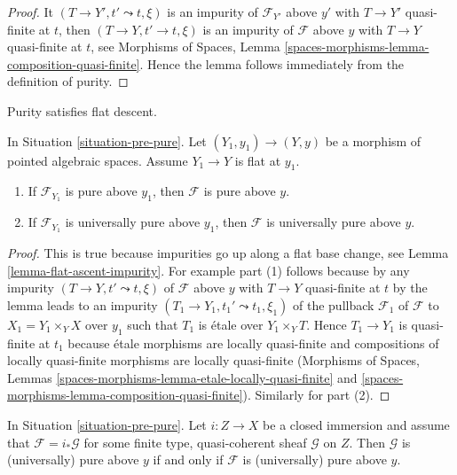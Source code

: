 \begin{proof}
It $(T \to Y', t' \leadsto t, \xi)$ is an impurity of
$\mathcal{F}_{Y'}$ above $y'$ with $T \to Y'$ quasi-finite at $t$,
then $(T \to Y, t' \to t, \xi)$ is an impurity of $\mathcal{F}$
above $y$ with $T \to Y$ quasi-finite at $t$, see
Morphisms of Spaces, Lemma
\ref{spaces-morphisms-lemma-composition-quasi-finite}.
Hence the lemma follows immediately from the definition of purity.
\end{proof}

\noindent
Purity satisfies flat descent.

\begin{lemma}
\label{lemma-flat-descend-pure}
In Situation \ref{situation-pre-pure}.
Let $(Y_1, y_1) \to (Y, y)$ be a morphism of pointed algebraic spaces.
Assume $Y_1 \to Y$ is flat at $y_1$.
\begin{enumerate}
\item If $\mathcal{F}_{Y_1}$ is pure above $y_1$,
then $\mathcal{F}$ is pure above $y$.
\item If $\mathcal{F}_{Y_1}$ is universally pure above $y_1$,
then $\mathcal{F}$ is universally pure above $y$.
\end{enumerate}
\end{lemma}

\begin{proof}
This is true because impurities go up along a flat base change, see
Lemma \ref{lemma-flat-ascent-impurity}. For example
part (1) follows because by any impurity $(T \to Y, t' \leadsto t, \xi)$
of $\mathcal{F}$ above $y$ with $T \to Y$ quasi-finite at $t$
by the lemma leads to an impurity
$(T_1 \to Y_1, t_1' \leadsto t_1, \xi_1)$ of the pullback
$\mathcal{F}_1$ of $\mathcal{F}$ to $X_1 = Y_1 \times_Y X$
over $y_1$ such that $T_1$ is \'etale over $Y_1 \times_Y T$.
Hence $T_1 \to Y_1$ is quasi-finite at $t_1$ because
\'etale morphisms are locally quasi-finite and compositions
of locally quasi-finite morphisms are locally quasi-finite
(Morphisms of Spaces, Lemmas
\ref{spaces-morphisms-lemma-etale-locally-quasi-finite} and
\ref{spaces-morphisms-lemma-composition-quasi-finite}).
Similarly for part (2).
\end{proof}

\begin{lemma}
\label{lemma-supported-on-closed}
In Situation \ref{situation-pre-pure}. Let $i : Z \to X$ be a closed immersion
and assume that $\mathcal{F} = i_*\mathcal{G}$ for some
finite type, quasi-coherent sheaf $\mathcal{G}$ on $Z$.
Then $\mathcal{G}$ is (universally) pure above $y$
if and only if $\mathcal{F}$ is (universally) pure above $y$.
\end{lemma}

